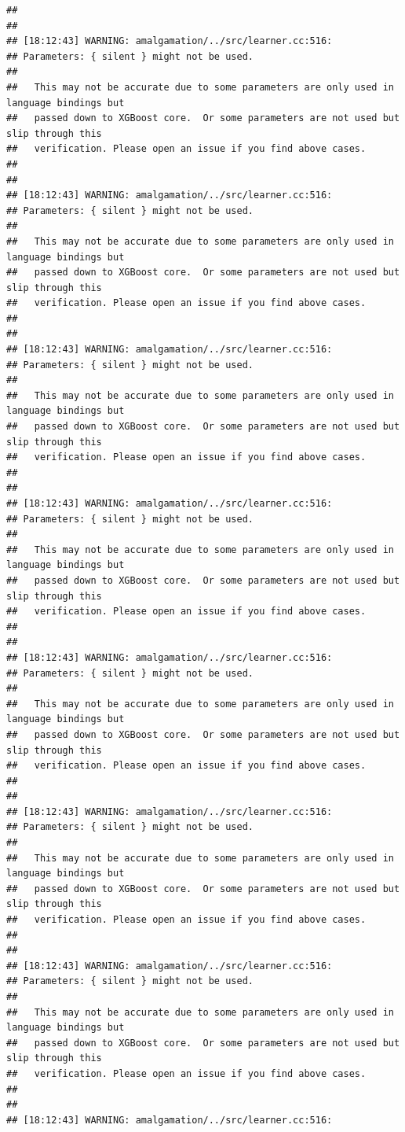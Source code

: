 \documentclass[AMS,STIX2COL]{WileyNJD-v2}\usepackage[]{graphicx}\usepackage[]{color}
\makeatletter
\newenvironment{kframe}{%
 \def\at@end@of@kframe{}%
 \ifinner\ifhmode%
  \def\at@end@of@kframe{\end{minipage}}%
  \begin{minipage}{\columnwidth}%
 \fi\fi%
 \def\FrameCommand##1{\hskip\@totalleftmargin \hskip-\fboxsep
 \colorbox{shadecolor}{##1}\hskip-\fboxsep
     \hskip-\linewidth \hskip-\@totalleftmargin \hskip\columnwidth}%
 \MakeFramed {\advance\hsize-\width
   \@totalleftmargin\z@ \linewidth\hsize
   \@setminipage}}%
 {\par\unskip\endMakeFramed%
 \at@end@of@kframe}
\newenvironment{knitrout}{}{} %
\makeatother
\begin{document}
\begin{knitrout}
\begin{kframe}
\begin{verbatim}
## 
## 
## [18:12:43] WARNING: amalgamation/../src/learner.cc:516: 
## Parameters: { silent } might not be used.
## 
##   This may not be accurate due to some parameters are only used in language bindings but
##   passed down to XGBoost core.  Or some parameters are not used but slip through this
##   verification. Please open an issue if you find above cases.
## 
## 
## [18:12:43] WARNING: amalgamation/../src/learner.cc:516: 
## Parameters: { silent } might not be used.
## 
##   This may not be accurate due to some parameters are only used in language bindings but
##   passed down to XGBoost core.  Or some parameters are not used but slip through this
##   verification. Please open an issue if you find above cases.
## 
## 
## [18:12:43] WARNING: amalgamation/../src/learner.cc:516: 
## Parameters: { silent } might not be used.
## 
##   This may not be accurate due to some parameters are only used in language bindings but
##   passed down to XGBoost core.  Or some parameters are not used but slip through this
##   verification. Please open an issue if you find above cases.
## 
## 
## [18:12:43] WARNING: amalgamation/../src/learner.cc:516: 
## Parameters: { silent } might not be used.
## 
##   This may not be accurate due to some parameters are only used in language bindings but
##   passed down to XGBoost core.  Or some parameters are not used but slip through this
##   verification. Please open an issue if you find above cases.
## 
## 
## [18:12:43] WARNING: amalgamation/../src/learner.cc:516: 
## Parameters: { silent } might not be used.
## 
##   This may not be accurate due to some parameters are only used in language bindings but
##   passed down to XGBoost core.  Or some parameters are not used but slip through this
##   verification. Please open an issue if you find above cases.
## 
## 
## [18:12:43] WARNING: amalgamation/../src/learner.cc:516: 
## Parameters: { silent } might not be used.
## 
##   This may not be accurate due to some parameters are only used in language bindings but
##   passed down to XGBoost core.  Or some parameters are not used but slip through this
##   verification. Please open an issue if you find above cases.
## 
## 
## [18:12:43] WARNING: amalgamation/../src/learner.cc:516: 
## Parameters: { silent } might not be used.
## 
##   This may not be accurate due to some parameters are only used in language bindings but
##   passed down to XGBoost core.  Or some parameters are not used but slip through this
##   verification. Please open an issue if you find above cases.
## 
## 
## [18:12:43] WARNING: amalgamation/../src/learner.cc:516: 

\end{verbatim}
\end{kframe}
\end{knitrout}
\end{document}
